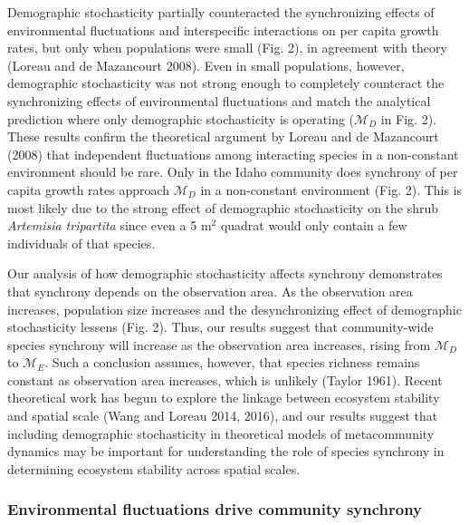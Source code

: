 \documentclass[12pt,]{article}
\begin{document}
Demographic stochasticity partially counteracted the synchronizing
effects of environmental fluctuations and interspecific interactions on
per capita growth rates, but only when populations were small (Fig. 2),
in agreement with theory (Loreau and {{de Mazancourt}} 2008). Even in
small populations, however, demographic stochasticity was not strong
enough to completely counteract the synchronizing effects of
environmental fluctuations and match the analytical prediction where
only demographic stochasticity is operating (\(\mathcal{M}_D\) in Fig.
2). These results confirm the theoretical argument by Loreau and {{de
Mazancourt}} (2008) that independent fluctuations among interacting
species in a non-constant environment should be rare. Only in the Idaho
community does synchrony of per capita growth rates approach
\(\mathcal{M}_D\) in a non-constant environment (Fig. 2). This is most
likely due to the strong effect of demographic stochasticity on the
shrub \emph{Artemisia tripartita} since even a 5 \(\text{m}^2\) quadrat
would only contain a few individuals of that species.

Our analysis of how demographic stochasticity affects synchrony
demonstrates that synchrony depends on the observation area. As the
observation area increases, population size increases and the
desynchronizing effect of demographic stochasticity lessens (Fig. 2).
Thus, our results suggest that community-wide species synchrony will
increase as the observation area increases, rising from
\(\mathcal{M}_D\) to \(\mathcal{M}_E\). Such a conclusion assumes,
however, that species richness remains constant as observation area
increases, which is unlikely (Taylor 1961). Recent theoretical work has
begun to explore the linkage between ecosystem stability and spatial
scale (Wang and Loreau 2014, 2016), and our results suggest that
including demographic stochasticity in theoretical models of
metacommunity dynamics may be important for understanding the role of
species synchrony in determining ecosystem stability across spatial
scales.

\subsubsection{Environmental fluctuations drive community
synchrony}\label{environmental-fluctuations-drive-community-synchrony}
\end{document}
